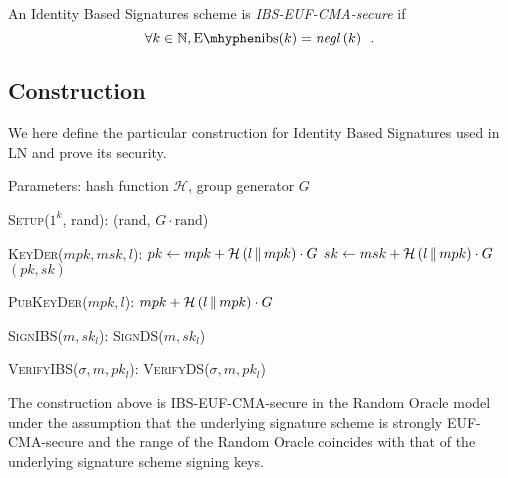   \begin{definition}
    \label{def:ibs:secure:sup}
    An Identity Based Signatures scheme is \emph{\textsf{IBS-EUF-CMA}-secure}
    if
    \begin{equation*}
      \forall k \in \mathbb{N}, \mathrm{E \mhyphen ibs}(k) =
      \mathit{negl}\left(k\right) \enspace.
    \end{equation*}
  \end{definition}

  \subsection{Construction}
    We here define the particular construction for Identity Based Signatures
    used in LN and prove its security.

    Parameters: hash function $\mathcal{H}$, group generator $G$
    \begin{algorithmic}[0]
      \State \textsc{Setup}($1^k$, rand):
      \Indent
        \State \Return (rand, $G \cdot \mathrm{rand}$)
      \EndIndent
    \end{algorithmic}

    \begin{algorithmic}[0]
      \State \textsc{KeyDer}($mpk, msk, l$):
      \Indent
        \State $pk \gets mpk + \mathcal{H}\left(l \,\|\, mpk\right) \cdot G$
        \State $sk \gets msk + \mathcal{H}\left(l \,\|\, mpk\right) \cdot G$
        \State \Return $(pk, sk)$
      \EndIndent
    \end{algorithmic}

    \begin{algorithmic}[0]
      \State \textsc{PubKeyDer}($mpk, l$):
      \Indent
        \State \Return $mpk + \mathcal{H}\left(l \,\|\, mpk\right) \cdot G$
      \EndIndent
    \end{algorithmic}

    \begin{algorithmic}[0]
      \State \textsc{SignIBS}($m, sk_l$):
      \Indent
        \State \Return \textsc{SignDS}($m, sk_l$)
      \EndIndent
    \end{algorithmic}

    \begin{algorithmic}[0]
      \State \textsc{VerifyIBS}($\sigma, m, pk_l$):
      \Indent
        \State \Return \textsc{VerifyDS}($\sigma, m, pk_l$)
      \EndIndent
    \end{algorithmic}

    \begin{theorem}
      \label{theorem:ibs}
      The construction above is \textsf{IBS-EUF-CMA}-secure in the Random Oracle
      model under the assumption that the underlying signature scheme is
      strongly \textsf{EUF-CMA}-secure and the range of the Random Oracle
      coincides with that of the underlying signature scheme signing keys.
    \end{theorem}
